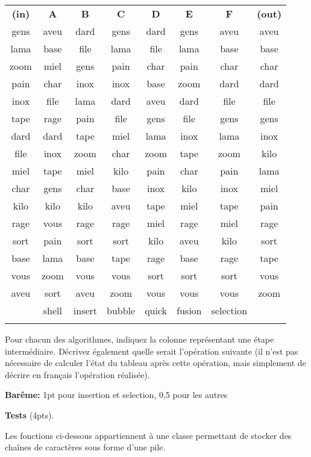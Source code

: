 \documentclass[10pt]{article}\usepackage[nu]{esial}
\begin{document}
\begin{center}
\begin{tabular}{|c c c c c c c c|}\hline
  \textbf{(in)}&\textbf{A}&\textbf{B}&\textbf{C}&\textbf{D}&\textbf{E}&\textbf{F}&\textbf{(out)}\\
  gens&aveu&dard&gens&dard&gens&aveu&aveu\\
  lama&base&file&lama&file&lama&base&base\\
  zoom&miel&gens&pain&char&pain&char&char\\
  pain&char&inox&inox&base&zoom&dard&dard\\
  inox&file&lama&dard&aveu&dard&file&file\\
  tape&rage&pain&file&gens&file&gens&gens\\
  dard&dard&tape&miel&lama&inox&lama&inox\\
  file&inox&zoom&char&zoom&tape&zoom&kilo\\
  miel&tape&miel&kilo&pain&char&pain&lama\\
  char&gens&char&base&inox&kilo&inox&miel\\
  kilo&kilo&kilo&aveu&tape&miel&tape&pain\\
  rage&vous&rage&rage&miel&rage&miel&rage\\
  sort&pain&sort&sort&kilo&aveu&kilo&sort\\
  base&lama&base&tape&rage&base&rage&tape\\
  vous&zoom&vous&vous&sort&sort&sort&vous\\
  aveu&sort&aveu&zoom&vous&vous&vous&zoom\\
\R{&shell&insert&bubble&quick&fusion&selection&\\}
  \hline
\end{tabular}
\end{center}

\Question Pour chacun des algorithmes, indiquez la colonne représentant une
étape intermédiaire. Décrivez également quelle serait l'opération suivante (il
n'est pas nécessaire de calculer l'état du tableau après cette opération, mais
simplement de décrire en français l'opération réalisée).

\begin{Reponse}
  \noindent\textbf{Barême:} 1pt pour insertion et selection, 0,5 pour les autres
\end{Reponse}

\Exercice\textbf{Tests} (4pts).

Les fonctions ci-dessous appartiennent à une classe permettant de stocker des
chaînes de caractères sous forme d'une pile.
\end{document}
